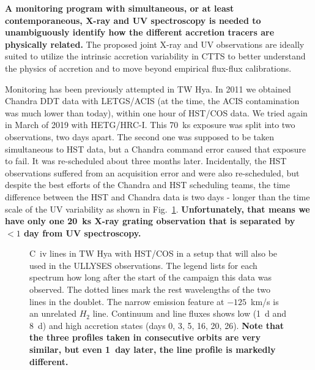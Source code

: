 \documentclass[letterpaper,11pt,twocolumn]{article}
\begin{document}
\textbf{A monitoring program with simultaneous, or at least contemporaneous, X-ray and UV spectroscopy
is needed to unambiguously identify how the different 
accretion tracers are physically related.} The proposed joint X-ray and UV observations are ideally
suited to utilize the intrinsic accretion variability in
CTTS to better understand the physics of accretion and to move beyond 
empirical flux-flux calibrations. 

Monitoring has been previously attempted in TW Hya. In 2011 we obtained Chandra DDT
data with LETGS/ACIS (at the time, the ACIS contamination was much lower than
today), within one hour of HST/COS data.
We tried again in March of 2019 with HETG/HRC-I. This 70~ks exposure was split into two
observations, two days apart. The second one was supposed to be taken simultaneous to HST data,
but a Chandra command error caused that exposure to fail. It was
re-scheduled about three months later. Incidentally, the HST observations
suffered from an acquisition error and were also re-scheduled, but despite the
best efforts of the Chandra and HST scheduling teams, the time difference
between the HST and Chandra data is two days - longer than the time scale of the
UV variability as shown in Fig.~\ref{fig:UV2}. \textbf{Unfortunately, that
  means we have only one 20~ks X-ray grating observation that is separated by
  $<1$ day from UV spectroscopy.}

\begin{figure}
\begin{center}
\end{center}
\caption{\label{fig:UV2} C~{\sc iv} lines in TW Hya with HST/COS in a setup that will also be used in the ULLYSES observations. The legend lists for each spectrum how long after the
  start of the campaign this data was observed. The dotted lines mark the rest wavelengths of the two
  lines in the  doublet. The narrow emission feature at $-125$~km/s is
  an unrelated $H_2$ line. Continuum and line fluxes shows low (1~d and 8~d) and high accretion states (days 0, 3, 5, 16, 20, 26).
\textbf{Note that the three
profiles taken in consecutive orbits are very similar, but even 1~day later,
the line profile is markedly different.}}
\end{figure}
\end{document}
